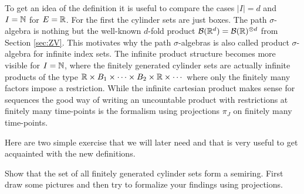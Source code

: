 To get an idea of the definition it is useful to compare the cases $|I|=d$ and $I=\mathbb{N}$ for $E=\mathbb{R}$. For the first the cylinder sets are just boxes. The path $\sigma$-algebra is nothing but the well-known $d$-fold product $\mathcal B(\mathbb{R}^d)=\mathcal B(\mathbb{R})^{\otimes d}$ from Section \ref{sec:ZV}. This motivates why the path $\sigma$-algebras is also called product $\sigma$-algebra for infinite index sets. The infinite product structure becomes more visible for $I=\mathbb{N}$, where the finitely generated cylinder sets are actually infinite products of the type $\mathbb{R}\times B_1 \times \cdots \times B_2\times \mathbb{R} \times \cdots$ where only the finitely many factors impose a restriction. While the infinite cartesian product makes sense for sequences the good way of writing an uncountable product with restrictions at finitely many time-points is the formalism using projections $\pi_J$ on finitely many time-points.\smallskip


Here are two simple exercise that we will later need and that is very useful to get acquainted with the new definitions.
\begin{luebung}
	Show that the set of all finitely generated cylinder sets form a semiring. First draw some pictures and then try to formalize your findings using projections.
\end{luebung}



